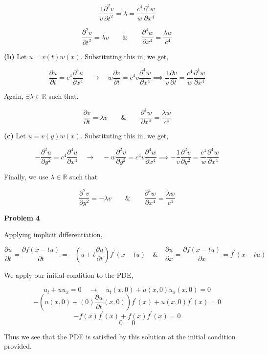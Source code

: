 \documentclass[10pt]{article}
\newcommand{\R}{\mathbb{R}}
\begin{document}
$$ \frac{1}{v}\frac{\partial^{2}v}{\partial t^{2}} = \lambda = \frac{c^{4}}{w}\frac{\partial^{4}w}{\partial x^{4}}$$

$$\frac{\partial^{2}v}{\partial t^{2}} = \lambda v \hspace{2em} \& \hspace{2em} \frac{\partial^{4}w}{\partial x^{4}} = \frac{\lambda w}{c^{4}}$$ 

\textbf{(b)}
Let $u = v(t)w(x)$. Substituting this in, we get,

$$\frac{\partial u}{\partial t} = c^{4} \frac{\partial^{4}u}{\partial x^{4}} \hspace{1em} \to \hspace{1em} w\frac{\partial v}{\partial t} = c^{4}v \frac{\partial^{4}w}{\partial x^{4}} \implies \frac{1}{v}\frac{\partial v}{\partial t} = \frac{c^{4}}{w} \frac{\partial^{4}w}{\partial x^{4}}$$

Again, $\exists \lambda \in \R$ such that,

$$\frac{\partial v}{\partial t} = \lambda v \hspace{2em} \& \hspace{2em} \frac{\partial^{4}w}{\partial x^{4}} = \frac{\lambda w}{c^{4}}$$ 

\textbf{(c)}
Let $u = v(y)w(x)$. Substituting this in, we get,

$$-\frac{\partial^{2} u}{\partial y^{2}} = c^{4} \frac{\partial^{4}u}{\partial x^{4}} \hspace{1em} \to \hspace{1em} -w\frac{\partial^{2} v}{\partial y^{2}} = c^{4}v \frac{\partial^{4}w}{\partial x^{4}} \implies -\frac{1}{v}\frac{\partial^{2} v}{\partial y^{2}} = \frac{c^{4}}{w} \frac{\partial^{4}w}{\partial x^{4}}$$

Finally, we use $\lambda \in \R$ such that

$$\frac{\partial^{2} v}{\partial y^{2}} = -\lambda v \hspace{2em} \& \hspace{2em} \frac{\partial^{4}w}{\partial x^{4}} = \frac{\lambda w}{c^{4}}$$ 

\newpage

\textbf{Problem 4}

Applying implicit differentiation,

$$\frac{\partial u}{\partial t} = \frac{\partial f(x-tu)}{\partial t} = -\left(u + t\frac{\partial u}{\partial t}\right) f^{\prime}(x-tu) \hspace{1em} \& \hspace{1em} \frac{\partial u}{\partial x} = \frac{\partial f(x-tu)}{\partial x} = f^{\prime}(x-tu)$$

We apply our initial condition to the PDE,

$$u_{t} + uu_{x} = 0 \hspace{1em} \to \hspace{1em} u_{t}(x,0) + u(x,0)u_{x}(x,0)= 0$$
$$-\left( u(x,0) + (0)\frac{\partial u}{\partial t}(x,0)\right)f^{\prime}(x) + u(x,0)f^{\prime}(x) = 0$$
$$-f(x)f^{\prime}(x) + f(x)f^{\prime}(x) = 0$$
$$0 =0$$

Thus we see that the PDE is satisfied by this solution at the initial condition provided.
\end{document}
